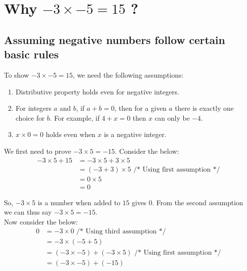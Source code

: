 \documentclass{article}
\begin{document}
\section*{Why $-3 \times -5 = 15$ ?}

\subsection{Assuming negative numbers follow certain basic rules}

To show $-3 \times -5 = 15$, we need the following assumptions:
\begin{enumerate}
\item Distributive property holds even for negative integers.
\item For integers $a$ and $b$, if $a + b = 0$, then for a given $a$ there is exactly one choice for $b$. For example, if $4 + x = 0$ then $x$ can only be $-4$.
\item $x \times 0 = 0$ holds even when $x$ is a negative integer.
\end{enumerate}


We first need to prove $-3 \times 5 = -15$. Consider the below:
\begin{displaymath}
\begin{split}
	-3 \times 5 + 15 & = -3 \times 5 + 3 \times 5\\
	                 & = (-3 + 3) \times 5 \mbox{\ \ \ \ /*\ Using first assumption\ */}  \\
	                 & = 0 \times 5\\
	                 & = 0
\end{split}
\end{displaymath}

So, $-3 \times 5$ is a number when added to $15$ gives $0$. From the second assumption we can thus say $-3 \times 5 = -15$.\\

Now consider the below:
\begin{displaymath}
	\begin{split}
	            0 & = -3 \times 0\mbox{\ \ \ \ \ \ \ \ \ \ \ \ \ \ \ \ \ \ \ \ \ \ \ \ \ /*\ Using third assumption\ */}  \\
	            & = -3 \times (-5+5)\\
	            & = (-3 \times -5) + (-3 \times 5) \mbox{\ \ \ \ /*\ Using first assumption\ */}  \\
	            & = (-3 \times -5) + (-15)
	\end{split}
\end{displaymath}
\end{document}
